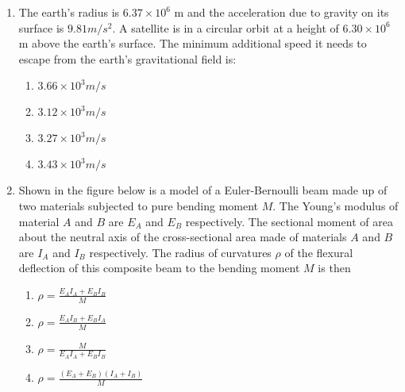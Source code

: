 \documentclass[journal]{IEEEtran}
\begin{document}
\begin{enumerate}
    \item The earth's radius is $6.37 \times 10^6$ m and the acceleration due to gravity on its surface
    is $9.81 m/s^2$. A satellite is in a circular orbit at a height of $6.30 \times 10^6$ m above the
    earth's surface. The minimum additional speed it needs to escape from the earth's gravitational field is:
    \begin{multicols}{2}
        \begin{enumerate}
            \item $3.66 \times 10^3 m/s$
            \item $3.12 \times 10^3 m/s$
            \item $3.27 \times 10^3 m/s$
            \item $3.43 \times 10^3 m/s$
        \end{enumerate}
    \end{multicols}

    \item Shown in the figure below is a model of a Euler-Bernoulli beam made up of two
    materials subjected to pure bending moment $M$. The Young's modulus of material $A$
    and $B$ are $E_A$ and $E_B$ respectively. The sectional moment of area about the neutral
    axis of the cross-sectional area made of materials $A$ and $B$ are $I_A$ and $I_B$
    respectively. The radius of curvatures $\rho$ of the flexural deflection of
    this composite beam to the bending moment $M$ is then

    
    \begin{multicols}{4}
        \begin{enumerate}
            \item $\rho = \frac{E_AI_A + E_BI_B}{M}$
            \item $\rho = \frac{E_AI_B + E_BI_A}{M}$
            \item $\rho = \frac{M}{E_AI_A + E_BI_B}$
            \item $\rho = \frac{(E_A + E_B)(I_A + I_B)}{M}$
        \end{enumerate}
    \end{multicols}


\end{enumerate}
\end{document}
